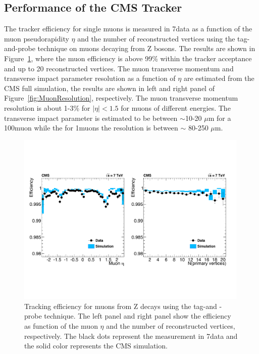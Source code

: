 \subsection{Performance of the CMS Tracker}

The tracker efficiency for single muons is measured in 7\TeV data as a
function of the muon pseudorapidity $\eta$ and the number of
reconstructed vertices using the tag-and-probe technique on muons
decaying from Z bosons. The results are shown in
Figure~\ref{fig:MuonEfficiency}, where the muon efficiency is above
99\% within the tracker acceptance and up to 20 reconstructed
vertices. The muon transverse momentum and transverse impact
parameter resolution as a function of  $\eta$ are estimated from the
CMS full simulation, the results are shown in left and right panel of
Figure~\ref{fig:MuonResolution}, respectively. The muon transverse
momentum resolution is about 1-3\% for $|\eta|<1.5$ for muons of
different energies. The transverse impact parameter is estimated to be
between $\sim$10-20 $\mu$m for a 100\GeV muon while the for 1\GeV muons the
resolution is between $\sim$ 80-250 $\mu$m.

\begin{figure}
 \centering
\includegraphics[width=0.99\textwidth]{CMS_DetectorFigures/TrackerMuonEff.pdf}
\caption{Tracking efficiency for muons from Z decays using the tag-and
 -probe technique. The left panel and right panel show the efficiency
 as function of the muon $\eta$ and the number of reconstructed
 vertices, respectively. The black dots represent the measurement in
 7\TeV data and the solid color represents the CMS simulation.\label{fig:MuonEfficiency}}
\end{figure}

